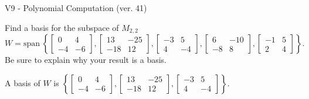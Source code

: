 \begin{exercise}
  \begin{exerciseTitle}V9 - Polynomial Computation (ver. 41)\end{exerciseTitle}
  \begin{exerciseStatement}
    Find a basis for the subspace of \(M_{2,2}\) 
\[W=\mathrm{span}\ \left\{\left[\begin{array}{cc}
0 & 4 \\
-4 & -6
\end{array}\right] , \left[\begin{array}{cc}
13 & -25 \\
-18 & 12
\end{array}\right] , \left[\begin{array}{cc}
-3 & 5 \\
4 & -4
\end{array}\right] , \left[\begin{array}{cc}
6 & -10 \\
-8 & 8
\end{array}\right] , \left[\begin{array}{cc}
-1 & 5 \\
2 & 4
\end{array}\right]\right\}.\]
 Be sure to explain why your result is a basis.


  \end{exerciseStatement}
  \begin{exerciseAnswer}
   A basis of \(W\) is  \(\left\{\left[\begin{array}{cc}
0 & 4 \\
-4 & -6
\end{array}\right] , \left[\begin{array}{cc}
13 & -25 \\
-18 & 12
\end{array}\right] , \left[\begin{array}{cc}
-3 & 5 \\
4 & -4
\end{array}\right]\right\}\).
  


  \end{exerciseAnswer}
\end{exercise}